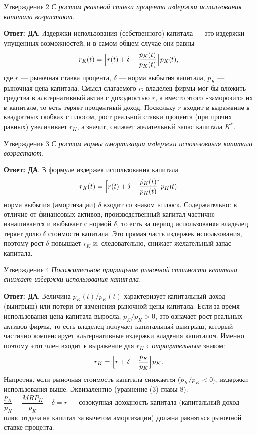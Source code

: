 \documentclass[10pt,a4paper]{article}
\newcommand{\qda}{\textbf{\color{yesgreen}Ответ: ДА}}
\newenvironment{answer}[2]{%
  \begin{qbox}{Утверждение #1}
  \textit{#2}\par\smallskip
}{%
  \end{qbox}\vspace{2pt}
}
\begin{document}
\begin{answer}{2}{С ростом реальной ставки процента издержки использования капитала возрастают.}
\qda. Издержки использования (собственного) капитала --- это издержки упущенных возможностей, и в самом общем случае они равны
\[
r_K(t)=\Bigl[r(t)+\delta-\dfrac{\dot p_K(t)}{p_K(t)}\Bigr]p_K(t),
\]
где $r$ --- рыночная ставка процента, $\delta$ --- норма выбытия капитала, $p_K$ --- рыночная цена капитала. Смысл слагаемого $r$: владелец фирмы мог бы вложить средства в альтернативный актив с доходностью $r$, а вместо этого «заморозил» их в капитале, то есть теряет процентный доход. Поскольку $r$ входит в выражение в квадратных скобках с плюсом, рост реальной ставки процента (при прочих равных) увеличивает $r_K$, а значит, снижает желательный запас капитала $K^*$.
\end{answer}

\begin{answer}{3}{С ростом нормы амортизации издержки использования капитала возрастают.}
\qda. В формуле издержек использования капитала
\[
r_K(t)=\Bigl[r(t)+\delta-\dfrac{\dot p_K(t)}{p_K(t)}\Bigr]p_K(t)
\]
норма выбытия (амортизации) $\delta$ входит со знаком «плюс». Содержательно: в отличие от финансовых активов, производственный капитал частично изнашивается и выбывает с нормой $\delta$, то есть за период использования владелец теряет долю $\delta$ стоимости капитала. Это прямая часть издержек использования, поэтому рост $\delta$ повышает $r_K$ и, следовательно, снижает желательный запас капитала.
\end{answer}

\begin{answer}{4}{Положительное приращение рыночной стоимости капитала снижает издержки использования капитала.}
\qda. Величина $\dot p_K(t)/p_K(t)$ характеризует капитальный доход (выигрыш) или потери от изменения рыночной цены капитала. Если за время использования цена капитала выросла, $\dot p_K/p_K>0$, это означает рост реальных активов фирмы, то есть владелец получает капитальный выигрыш, который частично компенсирует альтернативные издержки владения капиталом. Именно поэтому этот член входит в выражение для $r_K$ с \emph{отрицательным} знаком:
\[
r_K=\Bigl[r+\delta-\dfrac{\dot p_K}{p_K}\Bigr]p_K.
\]
Напротив, если рыночная стоимость капитала снижается ($\dot p_K/p_K<0$), издержки использования выше. Эквивалентно (уравнение (3) главы 8): $\dfrac{\dot p_K}{p_K}+\dfrac{MRP_K}{p_K}-\delta=r$ --- совокупная доходность капитала (капитальный доход плюс отдача на капитал за вычетом амортизации) должна равняться рыночной ставке процента.
\end{answer}
\end{document}
